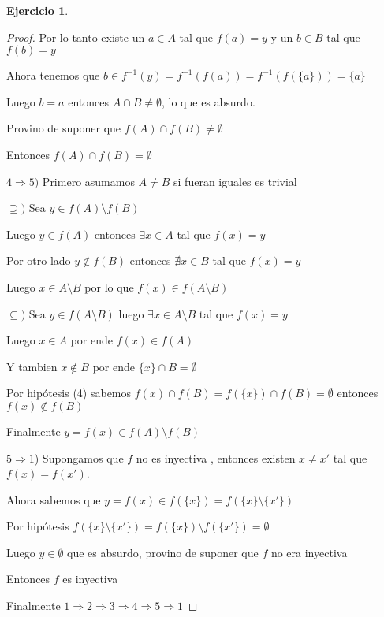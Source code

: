 \documentclass[12pt]{article}
\newcommand{\Ra}{\Rightarrow}
\theoremstyle{definition}
\newtheorem{ej}{Ejercicio}
\begin{document}
\begin{ej}
\begin{enumerate}
\begin{proof}
Por lo tanto existe un $a \in A$ tal que $f(a) = y$ y un $b\in B$ tal que $f(b) = y$

Ahora tenemos que $b\in f^{-1}(y) = f^{-1}(f(a)) = f^{-1}(f(\{a\})) = \{a\}$

Luego $b = a$ entonces $A \cap B \neq \emptyset$, lo que es absurdo.

Provino de suponer que $f(A) \cap f(B) \neq \emptyset$

Entonces $f(A) \cap f(B) = \emptyset$

\newpage

$4 \Ra 5 )$ Primero asumamos $A \neq B$ si fueran iguales es trivial

$\supseteq )$ Sea $y \in f(A) \setminus f(B)$ 

Luego $y \in f(A)$ entonces $\exists x \in A$ tal que $f(x) = y$

Por otro lado $y \notin f(B)$ entonces $\nexists x \in B$ tal que $f(x) = y$

Luego $x \in A \setminus B$ por lo que $f(x) \in f(A \setminus B)$

$\subseteq )$ Sea $y \in f(A \setminus B)$ luego $\exists x \in A \setminus B$ tal que $f(x) = y$

Luego $x \in A$ por ende $f(x) \in f(A)$

Y tambien $x \notin B$ por ende $\{x\} \cap B = \emptyset$

Por hipótesis (4) sabemos $f(x) \cap f(B)  = f(\{x\}) \cap f(B) = \emptyset$ entonces $f(x) \notin f(B)$

Finalmente $y = f(x) \in f(A) \setminus f(B)$

$5 \Ra 1$) Supongamos que $f$ no es inyectiva , entonces existen $x \neq x'$ tal que $f(x) = f(x')$.

Ahora sabemos que $y = f(x) \in f(\{x\}) = f(\{x\} \setminus \{x'\}) $ 

Por hipótesis $f(\{x\} \setminus \{x'\}) = f(\{x\}) \setminus f(\{x'\}) = \emptyset$

Luego $y \in\emptyset$ que es absurdo, provino de suponer que $f$ no era inyectiva

Entonces $f$ es inyectiva

Finalmente $1\Ra 2\Ra 3 \Ra 4 \Ra 5 \Ra 1$

\end{proof}
\end{enumerate}
\end{ej}
\end{document}
